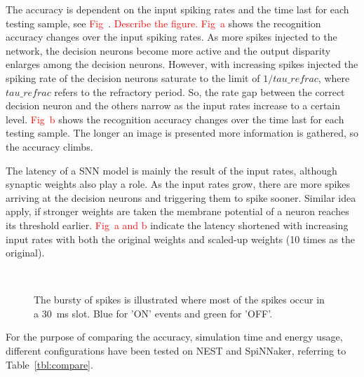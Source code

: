 The accuracy is dependent on the input spiking rates and the time last for each testing sample, see \textcolor{red}{Fig~}.
\textcolor{red}{Describe the figure.}
\textcolor{red}{Fig~a} shows the recognition accuracy changes over the input spiking rates.
As more spikes injected to the network, the decision neurons become more active and the output disparity enlarges among the decision neurons.
However, with increasing spikes injected the spiking rate of the decision neurons saturate to the limit of $1/tau\_refrac$, where $tau\_refrac$ refers to the refractory period.  
So, the rate gap between the correct decision neuron and the others narrow as the input rates increase to a certain level.
\textcolor{red}{Fig~b} shows the recognition accuracy changes over the time last for each testing sample.
The longer an image is presented more information is gathered, so the accuracy climbs.

The latency of a SNN model is mainly the result of the input rates, although synaptic weights also play a role.
As the input rates grow, there are more spikes arriving at the decision neurons and triggering them to spike sooner.
Similar idea apply, if stronger weights are taken the membrane potential of a neuron reaches its threshold earlier.
\textcolor{red}{Fig~a and b} indicate the latency shortened with increasing input rates with both the original weights and scaled-up weights (10 times as the original).

	\begin{figure}[htb!]
	  \centering
	  	  \\
	  \caption{The bursty of spikes is illustrated where most of the spikes occur in a 30~ms slot. Blue for 'ON' events and green for 'OFF'.}
	  \label{fig:assess}
	\end{figure}

For the purpose of comparing the accuracy, simulation time and energy usage, different configurations have been tested on NEST and SpiNNaker, referring to Table~\ref{tbl:compare}.

